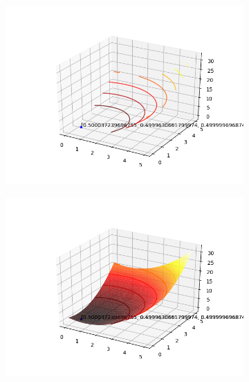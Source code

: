 \documentclass[a4paper, 12pt]{article}
\begin{document}
\begin{figure}[H]
\centering
\begin{subfigure}{0.3\textwidth}
  \centering
  \includegraphics[width=\linewidth]{1/D/x1x1/contorno.png}
\end{subfigure}%
\begin{subfigure}{0.3\textwidth}
  \centering
  \includegraphics[width=\linewidth]{1/D/x1x1/superficie.png}
\end{subfigure}
\begin{subfigure}{0.3\textwidth}
  \centering

\end{subfigure}
\end{figure}
\end{document}
